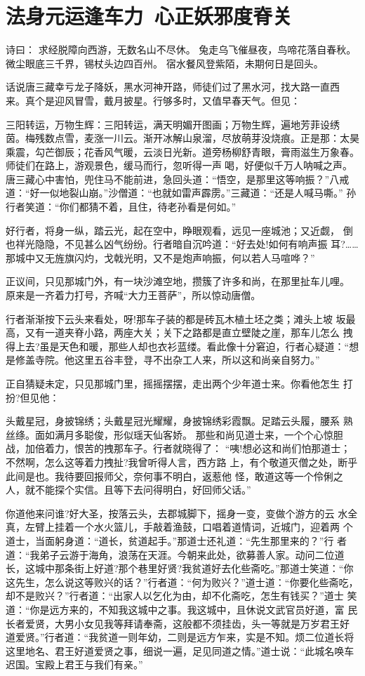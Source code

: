 \chapter{法身元运逢车力~心正妖邪度脊关}

诗曰：
求经脱障向西游，无数名山不尽休。
兔走乌飞催昼夜，鸟啼花落自春秋。
微尘眼底三千界，锡杖头边四百州。
宿水餐风登紫陌，未期何日是回头。

话说唐三藏幸亏龙子降妖，黑水河神开路，师徒们过了黑水河，找大路一直西
来。真个是迎风冒雪，戴月披星。行够多时，又值早春天气。但见：

三阳转运，万物生辉：三阳转运，满天明媚开图画；万物生辉，遍地芳菲设绣
茵。梅残数点雪，麦涨一川云。渐开冰解山泉溜，尽放萌芽没烧痕。正是那：太昊
乘震，勾芒御辰；花香风气暖，云淡日光新。道旁杨柳舒青眼，膏雨滋生万象春。
师徒们在路上，游观景色，缓马而行，忽听得一声喝，好便似千万人呐喊之声。
唐三藏心中害怕，兜住马不能前进，急回头道：“悟空，是那里这等响振？”八戒
道：“好一似地裂山崩。”沙僧道：“也就如雷声霹雳。”三藏道：“还是人喊马嘶。”
孙行者笑道：“你们都猜不着，且住，待老孙看是何如。”

好行者，将身一纵，踏云光，起在空中，睁眼观看，远见一座城池；又近觑，
倒也祥光隐隐，不见甚么凶气纷纷。行者暗自沉吟道：“好去处!如何有响声振
耳?……那城中又无旌旗闪灼，戈戟光明，又不是炮声响振，何以若人马喧哗？”

正议间，只见那城门外，有一块沙滩空地，攒簇了许多和尚，在那里扯车儿哩。
原来是一齐着力打号，齐喊“大力王菩萨”，所以惊动唐僧。

行者渐渐按下云头来看处，呀!那车子装的都是砖瓦木植土坯之类；滩头上坡
坂最高，又有一道夹脊小路，两座大关；关下之路都是直立壁陡之崖，那车儿怎么
拽得上去?虽是天色和暖，那些人却也衣衫蓝缕。看此像十分窘迫，行者心疑道：“想
是修盖寺院。他这里五谷丰登，寻不出杂工人来，所以这和尚亲自努力。”

正自猜疑未定，只见那城门里，摇摇摆摆，走出两个少年道士来。你看他怎生
打扮?但见他：

头戴星冠，身披锦绣；头戴星冠光耀耀，身披锦绣彩霞飘。足踏云头履，腰系
熟丝绦。面如满月多聪俊，形似瑶天仙客娇。
那些和尚见道士来，一个个心惊胆战，加倍着力，恨苦的拽那车子。行者就晓得了：
“咦!想必这和尚们怕那道士；不然啊，怎么这等着力拽扯?我曾听得人言，西方路
上，有个敬道灭僧之处，断乎此间是也。我待要回报师父，奈何事不明白，返惹他
怪，敢道这等一个伶俐之人，就不能探个实信。且等下去问得明白，好回师父话。”

你道他来问谁?好大圣，按落云头，去郡城脚下，摇身一变，变做个游方的云
水全真，左臂上挂着一个水火篮儿，手敲着渔鼓，口唱着道情词，近城门，迎着两
个道士，当面躬身道：“道长，贫道起手。”那道士还礼道：“先生那里来的？”行
者道：“我弟子云游于海角，浪荡在天涯。今朝来此处，欲募善人家。动问二位道
长，这城中那条街上好道?那个巷里好贤?我贫道好去化些斋吃。”那道士笑道：“你
这先生，怎么说这等败兴的话？”行者道：“何为败兴？”道士道：“你要化些斋吃，
却不是败兴？”行者道：“出家人以乞化为由，却不化斋吃，怎生有钱买？”道士
笑道：“你是远方来的，不知我这城中之事。我这城中，且休说文武官员好道，富
民长者爱贤，大男小女见我等拜请奉斋，这般都不须挂齿，头一等就是万岁君王好
道爱贤。”行者道：“我贫道一则年幼，二则是远方乍来，实是不知。烦二位道长将
这里地名、君王好道爱贤之事，细说一遍，足见同道之情。”道士说：“此城名唤车
迟国。宝殿上君王与我们有亲。”

